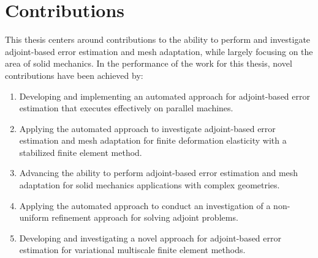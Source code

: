 \section{Contributions}

This thesis centers around contributions to the ability to
perform and investigate adjoint-based error estimation and mesh
adaptation, while largely focusing on the area of solid mechanics.
In the performance of the work for this thesis, novel contributions
have been achieved by:
%
\begin{enumerate}
\item Developing and implementing an automated approach
for adjoint-based error estimation that executes effectively
on parallel machines.
\item Applying the automated approach to investigate
adjoint-based error estimation and mesh adaptation for finite
deformation elasticity with a stabilized finite element method.
\item Advancing the ability to perform adjoint-based error
estimation and mesh adaptation for solid mechanics applications
with complex geometries.
\item Applying the automated approach to conduct an investigation
of a non-uniform refinement approach for solving adjoint problems.
\item Developing and investigating a novel approach for adjoint-based error
estimation for variational multiscale finite element methods.
\end{enumerate}
